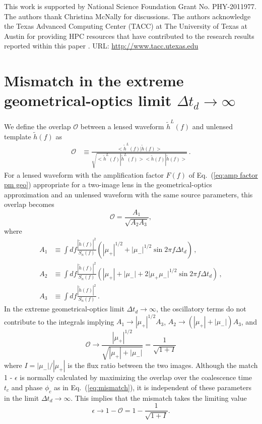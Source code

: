 \documentclass[floats,floatfix,showpacs,amssymb,prd,twocolumn,superscriptaddress,nofootinbib,nolongbibliography,reprint]{revtex4-2}
\begin{document}
This work is supported by National Science Foundation Grant No. PHY-2011977. The authors thank Christina McNally for discussions. The authors acknowledge the Texas Advanced Computing Center (TACC) at The University of Texas at Austin for providing HPC resources that have contributed to the research results reported within this paper \cite{10.1145/3093338.3093385}. URL: \href{http://www.tacc.utexas.edu }{http://www.tacc.utexas.edu} 


\appendix

\section{\label{appendix:Mismatch approximation in geometrical-optics limit}Mismatch in the extreme geometrical-optics limit $\Delta t_d \to \infty$}

We define the overlap $\mathcal{O}$ between a lensed waveform $\tilde{h}^L(f)$ and unlensed template $\tilde{h}(f)$ as
\begin{align}\label{appendix eq: overlap}
    \mathcal{O} &\equiv \frac{<\tilde{h}^L(f)| \tilde{h}(f)>}{\sqrt{<\tilde{h}^L(f)|\tilde{h}^L(f)> <\tilde{h}(f)|\tilde{h}(f)>}}\,.
\end{align}
For a lensed waveform with the amplification factor $F(f)$ of Eq.~(\ref{eq:amp factor pm geo}) appropriate for a two-image lens in the geometrical-optics approximation and an unlensed waveform with the same source parameters, this overlap becomes
\begin{equation} \label{E:LensOver}
\mathcal{O} = \frac{A_1}{\sqrt{A_2A_3}},
\end{equation}
where
\begin{subequations} \label{E:OverPieces}
\begin{align}
    A_1 &\equiv \int df \frac{|\tilde{h}(f)|^2}{S_n(f)}(|\mu_+|^{1/2} + |\mu_-|^{1/2} \sin 2\pi f \Delta t_d)\,, \\
    A_2 &\equiv \int df \frac{|\tilde{h}(f)|^2}{S_n(f)}(|\mu_+| + |\mu_-| + 2 \lvert \mu_+ \mu_- \rvert^{1/2} \sin 2\pi f\Delta t_d)\,, \\
    A_3 &\equiv \int df \frac{|\tilde{h}(f)|^2}{S_n(f)}\,.
\end{align}
\end{subequations}
In the extreme geometrical-optics limit $\Delta t_d \to \infty$, the oscillatory terms do not contribute to the integrals implying $A_1 \to |\mu_+|^{1/2}A_3$, $A_2 \to (|\mu_+| + |\mu_-|)A_3$, and
\begin{equation}
\mathcal{O} \to \frac{|\mu_+|^{1/2}}{\sqrt{|\mu_+| + |\mu_-|}} = \frac{1}{\sqrt{1+I}}
\end{equation}
where $I = |\mu_-|/|\mu_+|$ is the flux ratio between the two images.
Although the match 1 - $\epsilon$ is normally calculated by maximizing the overlap  over the coalescence time $t_c$ and phase $\phi_c$ as in Eq.~(\ref{eq:mismatch}), it is independent of these parameters in the limit $\Delta t_d \to \infty$.  This implies that the mismatch takes the limiting value
\begin{equation} \label{E:MMexgeo}
\epsilon \to 1 - \mathcal{O} = 1 - \frac{1}{\sqrt{1 + I}}.
\end{equation}
\end{document}
